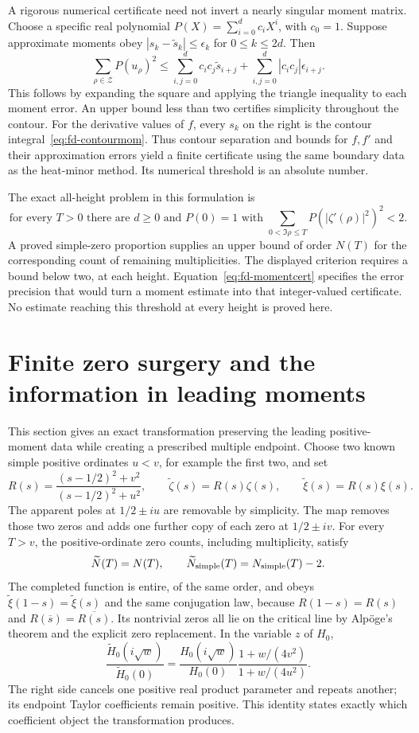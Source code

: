 A rigorous numerical certificate need not invert a nearly singular
moment matrix.  Choose a specific real polynomial
$P(X)=\sum_{i=0}^d c_iX^i$, with $c_0=1$.
Suppose approximate moments obey
$|s_k-\widetilde s_k|\le\epsilon_k$ for $0\le k\le2d$.
Then
\begin{equation}\label{eq:fd-momentcert}
 \sum_{\rho\in\mathcal Z}P(u_\rho)^2
 \le\sum_{i,j=0}^dc_ic_j\widetilde s_{i+j}
       +\sum_{i,j=0}^d|c_ic_j|\epsilon_{i+j}.
\end{equation}
This follows by expanding the square and applying the triangle
inequality to each moment error.  An upper bound less than two
certifies simplicity throughout the contour.
For the derivative values of $f$, every $s_k$ on the right is the
contour integral~\eqref{eq:fd-contourmom}.
Thus contour separation and bounds for $f,f'$ and their approximation
errors yield a finite certificate using the same boundary data as the
heat-minor method.  Its numerical threshold is an absolute number.

The exact all-height problem in this formulation is
\[
 \text{for every }T>0\text{ there are }d\ge0\text{ and }P(0)=1
 \text{ with }
 \sum_{0<\Im\rho\le T}P(|\zeta'(\rho)|^2)^2<2.
\]
A proved simple-zero proportion supplies an upper bound of order
$N(T)$ for the corresponding count of remaining multiplicities.
The displayed criterion requires a bound below two, at each height.
Equation~\eqref{eq:fd-momentcert} specifies the error precision that
would turn a moment estimate into that integer-valued certificate.
No estimate reaching this threshold at every height is proved here.

\section{Finite zero surgery and the information in leading moments}
\label{sec:fd-surgery}
This section gives an exact transformation preserving the leading positive-moment data while creating a prescribed multiple endpoint.
Choose two known simple positive ordinates $u<v$, for example the
first two, and set
\[
 R(s)=\frac{(s-1/2)^2+v^2}{(s-1/2)^2+u^2},\qquad
 \widetilde\zeta(s)=R(s)\zeta(s),\qquad
 \widetilde\xi(s)=R(s)\xi(s).
\]
The apparent poles at $1/2\pm iu$ are removable by simplicity.
The map removes those two zeros and adds one further copy of each
zero at $1/2\pm iv$.
For every $T>v$, the positive-ordinate zero counts, including
multiplicity, satisfy
\[
 \widetilde N(T)=N(T),\qquad
 \widetilde N_{\rm simple}(T)=N_{\rm simple}(T)-2.
\]
The completed function is entire, of the same order, and obeys
$\widetilde\xi(1-s)=\widetilde\xi(s)$ and the same conjugation law,
because $R(1-s)=R(s)$ and $R(\overline s)=\overline{R(s)}$.
Its nontrivial zeros all lie on the critical line by Alp\"oge's theorem
and the explicit zero replacement.  In the variable $z$ of $H_0$,
\[
 \frac{\widetilde H_0(i\sqrt w)}{\widetilde H_0(0)}
 =\frac{H_0(i\sqrt w)}{H_0(0)}
       \frac{1+w/(4v^2)}{1+w/(4u^2)}.
\]
The right side cancels one positive real product parameter and
repeats another; its endpoint Taylor coefficients remain positive.
This identity states exactly which coefficient object the
transformation produces.

